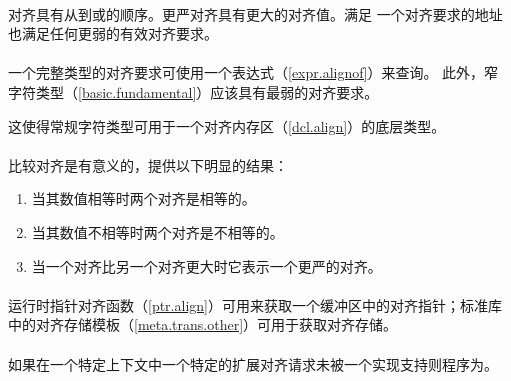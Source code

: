 \paragraph{} %
对齐具有从到或的顺序。更严对齐具有更大的对齐值。满足
一个对齐要求的地址也满足任何更弱的有效对齐要求。

\paragraph{} %
一个完整类型的对齐要求可使用一个表达式（\ref{expr.alignof}）来查询。
此外，窄字符类型（\ref{basic.fundamental}）应该具有最弱的对齐要求。

\begin{note}
  这使得常规字符类型可用于一个对齐内存区（\ref{dcl.align}）的底层类型。
\end{note}

\paragraph{} %
比较对齐是有意义的，提供以下明显的结果：
\begin{enumerate}
  \item 当其数值相等时两个对齐是相等的。
  \item 当其数值不相等时两个对齐是不相等的。
  \item 当一个对齐比另一个对齐更大时它表示一个更严的对齐。
\end{enumerate}

\paragraph{} %
\begin{note}
  运行时指针对齐函数（\ref{ptr.align}）可用来获取一个缓冲区中的对齐指针；标准库
  中的对齐存储模板（\ref{meta.trans.other}）可用于获取对齐存储。
\end{note}

\paragraph{} %
如果在一个特定上下文中一个特定的扩展对齐请求未被一个实现支持则程序为\illform{}。
